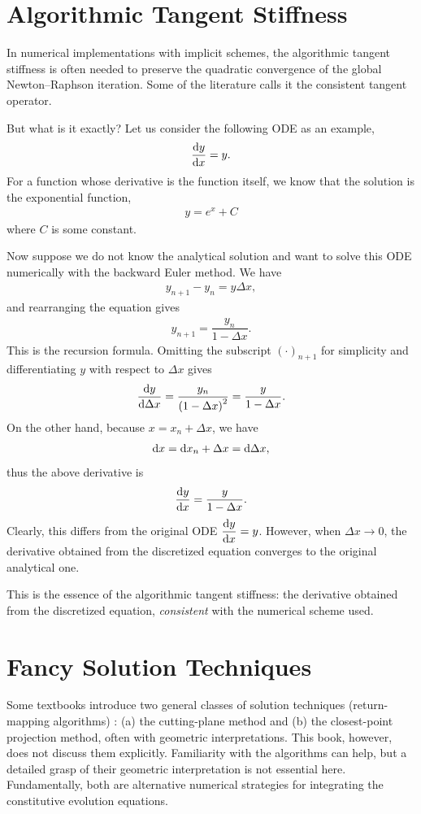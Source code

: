 \section{Algorithmic Tangent Stiffness}
In numerical implementations with implicit schemes, the algorithmic tangent stiffness is often needed to preserve the quadratic convergence of the global Newton--Raphson iteration.
Some of the literature calls it the consistent tangent operator.

But what is it exactly?
Let us consider the following ODE as an example,
\begin{gather}
    \dfrac{\mathrm{d}y}{\mathrm{d}x}=y.
\end{gather}
For a function whose derivative is the function itself, we know that the solution is the exponential function,
\begin{gather}
    y=e^x+C
\end{gather}
where $C$ is some constant.

Now suppose we do not know the analytical solution and want to solve this ODE numerically with the backward Euler method.
We have
\begin{gather}
    y_{n+1}-y_n=y\Delta{}x,
\end{gather}
and rearranging the equation gives
\begin{gather}
    y_{n+1}=\dfrac{y_n}{1-\Delta{}x}.
\end{gather}
This is the recursion formula.
Omitting the subscript $\left(\cdot\right)_{n+1}$ for simplicity and differentiating $y$ with respect to $\Delta{}x$ gives
\begin{gather}
    \dfrac{\mathrm{d}y}{\mathrm{d}\Delta{}x}=\dfrac{y_n}{\left(1-\Delta{}x\right)^2}=\dfrac{y}{1-\Delta{}x}.
\end{gather}
On the other hand, because $x=x_n+\Delta{}x$, we have
\begin{gather}
    \mathrm{d}x=\mathrm{d}x_n+\Delta{}x=\mathrm{d}\Delta{}x,
\end{gather}
thus the above derivative is
\begin{gather}
    \dfrac{\mathrm{d}y}{\mathrm{d}x}=\dfrac{y}{1-\Delta{}x}.
\end{gather}
Clearly, this differs from the original ODE $\dfrac{\mathrm{d}y}{\mathrm{d}x}=y$.
However, when $\Delta{}x\to0$, the derivative obtained from the discretized equation converges to the original analytical one.

This is the essence of the algorithmic tangent stiffness: the derivative obtained from the discretized equation, \textit{consistent} with the numerical scheme used.
\section{Fancy Solution Techniques}
Some textbooks introduce two general classes of solution techniques (return-mapping algorithms) \cite[see \S~3.6]{Simo1998}: (a) the cutting-plane method and (b) the closest-point projection method, often with geometric interpretations.
This book, however, does not discuss them explicitly.
Familiarity with the algorithms can help, but a detailed grasp of their geometric interpretation is not essential here.
Fundamentally, both are alternative numerical strategies for integrating the constitutive evolution equations.

